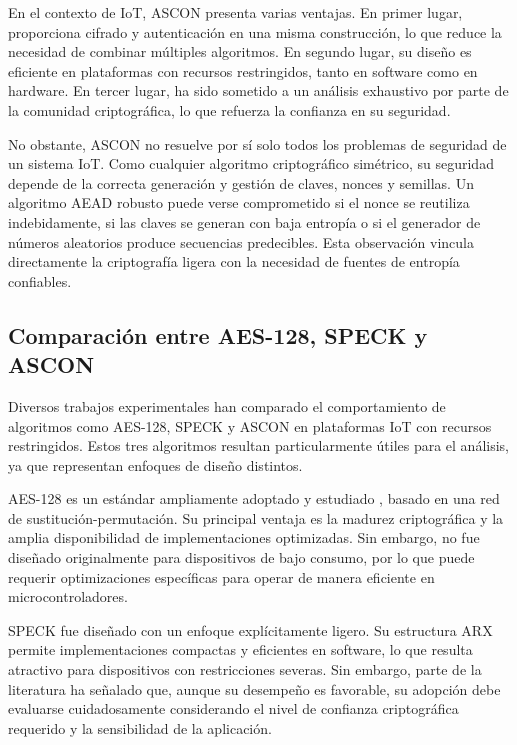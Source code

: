 En el contexto de IoT, ASCON presenta varias ventajas. En primer lugar, proporciona cifrado y autenticación en una misma construcción, lo que reduce la necesidad de combinar múltiples algoritmos. En segundo lugar, su diseño es eficiente en plataformas con recursos restringidos, tanto en software como en hardware. En tercer lugar, ha sido sometido a un análisis exhaustivo por parte de la comunidad criptográfica, lo que refuerza la confianza en su seguridad.

No obstante, ASCON no resuelve por sí solo todos los problemas de seguridad de un sistema IoT. Como cualquier algoritmo criptográfico simétrico, su seguridad depende de la correcta generación y gestión de claves, nonces y semillas. Un algoritmo AEAD robusto puede verse comprometido si el nonce se reutiliza indebidamente, si las claves se generan con baja entropía o si el generador de números aleatorios produce secuencias predecibles. Esta observación vincula directamente la criptografía ligera con la necesidad de fuentes de entropía confiables.

\subsection{Comparación entre AES-128, SPECK y ASCON}

Diversos trabajos experimentales han comparado el comportamiento de algoritmos como AES-128, SPECK y ASCON en plataformas IoT con recursos restringidos. Estos tres algoritmos resultan particularmente útiles para el análisis, ya que representan enfoques de diseño distintos.

AES-128 es un estándar ampliamente adoptado y estudiado \cite{Radhakrishnan2024EfficiencyDevices}, basado en una red de sustitución-permutación. Su principal ventaja es la madurez criptográfica y la amplia disponibilidad de implementaciones optimizadas. Sin embargo, no fue diseñado originalmente para dispositivos de bajo consumo, por lo que puede requerir optimizaciones específicas para operar de manera eficiente en microcontroladores.

SPECK fue diseñado con un enfoque explícitamente ligero. Su estructura ARX permite implementaciones compactas y eficientes en software, lo que resulta atractivo para dispositivos con restricciones severas. Sin embargo, parte de la literatura ha señalado que, aunque su desempeño es favorable, su adopción debe evaluarse cuidadosamente considerando el nivel de confianza criptográfica requerido y la sensibilidad de la aplicación.

